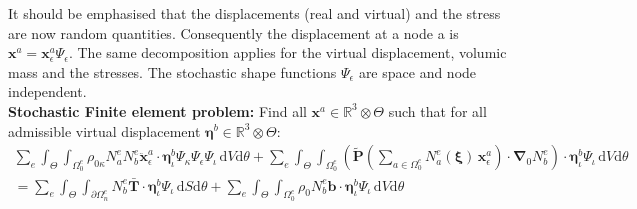 \documentclass[oneside,11pt,times]{book}
\begin{document}
It should be emphasised that the displacements (real and virtual) and the stress are now random quantities. Consequently the displacement at a node a is $\bm{x}^a = \bm{x}^a_{\epsilon}\Psi_{\epsilon}$. The same decomposition applies for the virtual displacement, volumic mass and the stresses. The stochastic shape functions $\Psi_{\epsilon}$ are space and node independent.
\\
\textbf{Stochastic Finite element problem:} Find all $\bm{x}^a \in \mathbb{R}^3 \otimes \Theta$ such that for all admissible virtual displacement $\bm{\eta}^b \in \mathbb{R}^3 \otimes \Theta$:
%
\begin{equation} \label{equationGlobalWeakForm0}
 \begin{split}
 \sum_e \int_{\Theta}\int_{\Omega_{0}^e} \rho_{0\kappa} N^e_a N^e_b \ddot{\bm{x}}^a_{\epsilon} \cdot \bm{\eta}^b_{\iota} \Psi_{\kappa}\Psi_{\epsilon}\Psi_{\iota}\, \text{d} V  \text{d}\theta  + \sum_e \int_{\Theta}\int_{\Omega_{0}^e} \left(\tilde{\bm{P}}\left( \sum_{a \in \Omega_{0}^e} N^e_{a}(\bm{\xi})\, \bm{x}^a_{\epsilon} \right) \cdot  \bm{\nabla}\!_0 N^e_b  \right)  \cdot \bm{\eta}^b_{\iota}\Psi_{\iota}\, \text{d} V \text{d}\theta \\ = \sum_e \int_{\Theta} \int_{\partial \Omega_{n}^e} N_b^e \bar{\bm{T}} \cdot \bm{\eta}^b_{\iota} \Psi_{\iota} \, \text{d} S \text{d}\theta + \sum_e \int_{\Theta}\int_{\Omega_{0}^e} \rho_0 N_b^e \bm{b} \cdot \bm{\eta}^b_{\iota} \Psi_{\iota} \, \text{d} V \text{d}\theta
 \end{split}
\end{equation}
%
\end{document}
